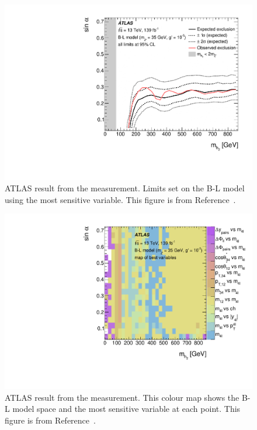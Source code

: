 \begin{figure}
    \centering
    \includegraphics[width=\mediumfigwidth]{Figures/m4l/Interpretations/UpperLimitBandWithContour_2D_withTheoExcl.pdf}
    \caption{ATLAS result from the \mFourL{} measurement. Limits set on the B-L model using the most sensitive variable. This figure is from Reference~\cite{m4l2021_paper}.}
    \label{fig:BLcontour}
\end{figure}
\begin{figure}
    \centering
    \includegraphics[width=\mediumfigwidth]{Figures/m4l/Interpretations/UpperLimitBandWithContour_2D_colormap.pdf}
    \caption{ATLAS result from the \mFourL{} measurement. This colour map shows the B-L model space and the most sensitive variable at each point. This figure is from Reference~\cite{m4l2021_paper}.}
    \label{fig:BLcolourmap}
\end{figure}

